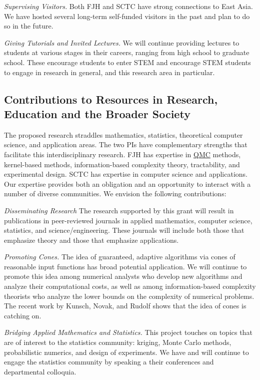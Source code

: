 \documentclass[11pt]{NSFamsart}
\newcommand{\QMC}{\hyperlink{QMClink}{QMC}\xspace}
\begin{document}
\emph{Supervising Visitors.}
Both FJH and SCTC have strong connections to East Asia.  We have hosted several long-term 
self-funded visitors in the past and plan to do so in the future.

\emph{Giving Tutorials and Invited Lectures.}
We will continue providing lectures to students at various stages in their careers, ranging from high
school to graduate school. These encourage students to enter STEM and encourage STEM students 
to engage in research in general, and this research area in particular.


\subsection{Contributions to Resources in Research, Education and the Broader Society} 
\label{BroaderTwoSec}

The proposed research straddles mathematics, statistics, theoretical computer science, and 
application areas.  The two PIs have complementary strengths that facilitate this interdisciplinary research.  FJH 
has expertise in \QMC methods, kernel-based methods, information-based complexity 
theory, tractability, and experimental design. SCTC has expertise in computer science and applications.  Our 
expertise provides both an obligation and an opportunity to interact with a number of diverse 
communities. We envision the following contributions:

\emph{Disseminating Research}
The research supported by this grant will result in publications in peer-reviewed journals in applied
mathematics, computer science, statistics, and science/engineering. These 
journals will include both those that emphasize theory and those that emphasize applications.

\emph{Promoting Cones.} The idea of guaranteed, adaptive algorithms via cones of reasonable input 
functions has broad potential application.  We will continue to promote this idea among numerical analysts 
who 
develop new algorithms and analyze their computational costs, as well as among information-based 
complexity theorists who analyze the lower bounds on the complexity of numerical problems.  The recent work by Kunsch, Novak, and Rudolf \cite{KunEtal19a} shows that the idea of cones is catching on.

\emph{Bridging Applied Mathematics and Statistics.}
This project touches on topics that are of interest to the statistics community: kriging, Monte Carlo methods, probabilistic numerics, and design of experiments.  We have and will continue to engage the statistics community 
by speaking a their conferences and departmental colloquia.
\end{document}
